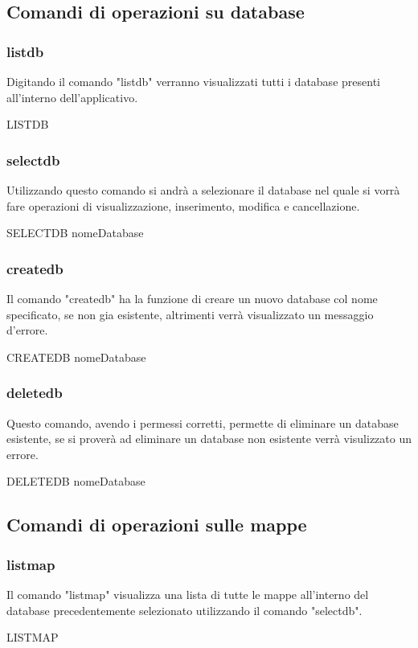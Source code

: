 \documentclass[a4paper]{article}
\begin{document}
		\subsection{Comandi di operazioni su database}
			\subsubsection{listdb}
			Digitando il comando "listdb" verranno visualizzati tutti i database presenti all'interno dell'applicativo.
			\begin{center}
				LISTDB 
			\end{center}
			\subsubsection{selectdb}
			Utilizzando questo comando si andrà a selezionare il database nel quale si vorrà fare operazioni di visualizzazione, inserimento, modifica e cancellazione.
			\begin{center}
				SELECTDB nomeDatabase
			\end{center}
			\subsubsection{createdb}
			Il comando "createdb" ha la funzione di creare un nuovo database col nome specificato, se non gia esistente, altrimenti verrà visualizzato un messaggio d'errore.
			\begin{center}
				CREATEDB nomeDatabase
			\end{center}
			\subsubsection{deletedb}
			Questo comando, avendo i permessi corretti, permette di eliminare un database esistente, se si proverà ad eliminare un database non esistente verrà visulizzato un errore.
			\begin{center}
				DELETEDB nomeDatabase
			\end{center}
		\subsection{Comandi di operazioni sulle mappe}
			\subsubsection{listmap}
			Il comando "listmap" visualizza una lista di tutte le mappe all'interno del database precedentemente selezionato utilizzando il comando "selectdb".
			\begin{center}
				LISTMAP
			\end{center}
\end{document}
